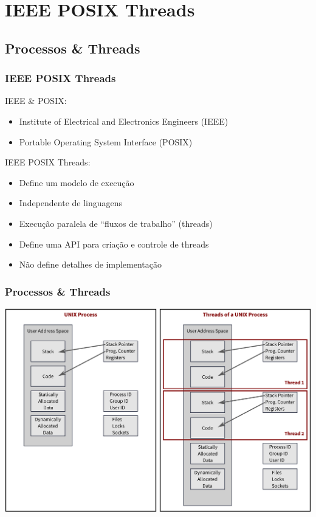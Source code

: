 \documentclass[10pt, compress, aspectratio=169, xcolor={table,usenames,dvipsnames}]{beamer}
\begin{document}
\section{IEEE POSIX Threads}

\subsection{Processos \& Threads}

\begin{frame}
    \frametitle{IEEE POSIX Threads}

    \alert{IEEE} \& \alert{POSIX}:
    \begin{itemize}
        \item Institute of Electrical and Electronics Engineers (\alert{IEEE})
        \item Portable Operating System Interface (\alert{POSIX})
    \end{itemize}

    \alert{IEEE POSIX Threads}:
    \begin{itemize}
        \item Define um \alert{modelo de execução}
        \item \alert{Independente} de linguagens
        \item Execução paralela de ``\alert{fluxos de trabalho}'' (\alert{threads})
        \item Define uma API para \alert{criação e controle} de threads
        \item \alert{Não define} detalhes de implementação
    \end{itemize}
\end{frame}

\begin{frame}
    \frametitle{Processos \& Threads}
    \begin{center}
        \includegraphics[width=0.8\columnwidth]{process-and-thread}
    \end{center}
\end{frame}
\end{document}
